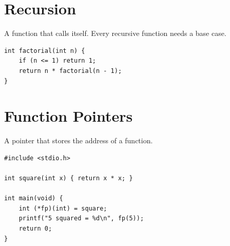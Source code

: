 \documentclass[11pt,a4paper]{article}
\begin{document}
\section{Recursion}
A function that calls itself. Every recursive function needs a base case.

\begin{lstlisting}
int factorial(int n) {
    if (n <= 1) return 1;
    return n * factorial(n - 1);
}
\end{lstlisting}

\section{Function Pointers}
A pointer that stores the address of a function.

\begin{lstlisting}
#include <stdio.h>

int square(int x) { return x * x; }

int main(void) {
    int (*fp)(int) = square;
    printf("5 squared = %d\n", fp(5));
    return 0;
}
\end{lstlisting}
\end{document}
